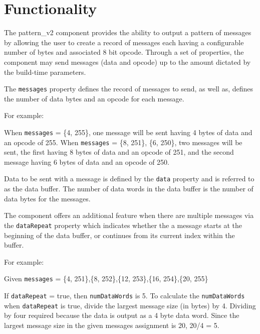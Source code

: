 \documentclass{article}
\def\comp{pattern\_v2}
\begin{document}
\section*{Functionality}
\begin{flushleft}

The {\comp} component provides the ability to output a pattern of messages by allowing the user to create a record of messages each having a configurable number of bytes and associated 8 bit opcode. Through a set of properties, the component may send messages (data and opcode) up to the amount dictated by the build-time parameters. \newline

The \texttt{messages} property defines the record of messages to send, as well as, defines the number of data bytes and an opcode for each message. \newline

For example: \newline

When \texttt{messages} = \{4, 255\}, one message will be sent having 4 bytes of data and an opcode of 255. \newline
When \texttt{messages} = \{8, 251\}, \{6, 250\}, two messages will be sent, the first having 8 bytes of data and an opcode of 251, and the second message having 6 bytes of data and an opcode of 250. \newline

Data to be sent with a message is defined by the \texttt{data} property and is referred to as the data buffer. The number of data words in the data buffer is the number of data bytes for the messages. \newline

The component offers an additional feature when there are multiple messages via the \texttt{dataRepeat} property which indicates whether the a message starts at the beginning of the data buffer, or continues from its current index within the buffer. \newline

For example: \newline

Given \texttt{messages} = \{4, 251\},\{8, 252\},\{12, 253\},\{16, 254\},\{20, 255\} \newline

If \texttt{dataRepeat} = true, then \texttt{numDataWords} is 5. To calculate the \texttt{numDataWords} when \texttt{dataRepeat} is true, divide the largest message size (in bytes) by 4. Dividing by four required because the data is output as a 4 byte data word. Since the largest message size in the given messages assignment is 20, 20/4 = 5. \newline


\end{flushleft}
\end{document}
